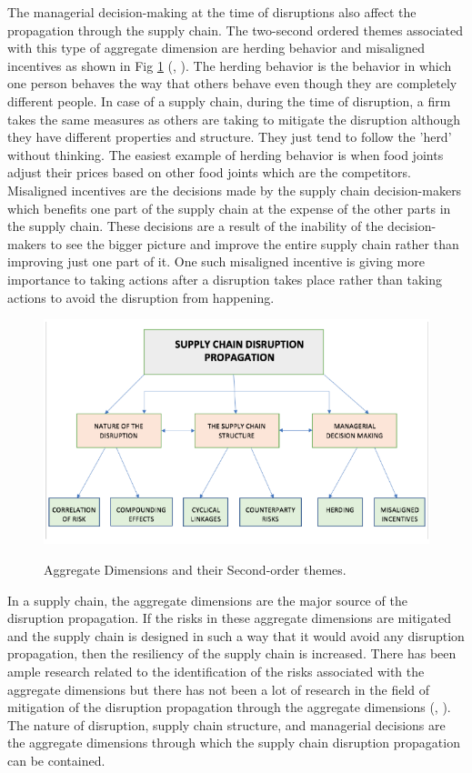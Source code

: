 The managerial decision-making at the time of disruptions also affect the propagation through the supply chain. The two-second ordered themes associated with this type of aggregate dimension are herding behavior and misaligned incentives as shown in Fig \ref{Aggregate Dimensions} (\citeauthor{Scheibe2017}, \citeyear{Scheibe2017}). The herding behavior is the behavior in which one person behaves the way that others behave even though they are completely different people. In case of a supply chain, during the time of disruption, a firm takes the same measures as others are taking to mitigate the disruption although they have different properties and structure. They just tend to follow the 'herd' without thinking. The easiest example of herding behavior is when food joints adjust their prices based on other food joints which are the competitors. Misaligned incentives are the decisions made by the supply chain decision-makers which benefits one part of the supply chain at the expense of the other parts in the supply chain. These decisions are a result of the inability of the decision-makers to see the bigger picture and improve the entire supply chain rather than improving just one part of it. One such misaligned incentive is giving more importance to taking actions after a disruption takes place rather than taking actions to avoid the disruption from happening. 


\begin{figure}[H]
  \centering
  \includegraphics[width=4.5in]{figures/pdf/Aggregate-Dimensions.png}\\
  \caption{Aggregate Dimensions and their Second-order themes.}\label{Aggregate Dimensions}
\end{figure}

In a supply chain, the aggregate dimensions are the major source of the disruption propagation. If the risks in these aggregate dimensions are mitigated and the supply chain is designed in such a way that it would avoid any disruption propagation, then the resiliency of the supply chain is increased. There has been ample research related to the identification of the risks associated with the aggregate dimensions but there has not been a lot of research in the field of mitigation of the disruption propagation through the aggregate dimensions (\citeauthor{Scheibe2017}, \citeyear{Scheibe2017}). The nature of disruption, supply chain structure, and managerial decisions are the aggregate dimensions through which the supply chain disruption propagation can be contained.

